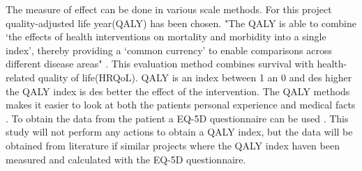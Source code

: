 The measure of effect can be done in various scale methods. For this project quality-adjusted life year(QALY) has been chosen. "The QALY is able to combine ‘the effects of health interventions on mortality and morbidity into a single index’, thereby providing a ‘common currency’ to enable comparisons across different disease areas" \cite{QALY}. This evaluation method combines survival with health-related quality of life(HRQoL). QALY is an index between  1 an 0 and des higher the QALY index is des better the effect of the intervention. The QALY methods makes it easier to look at both the patients personal experience and medical facts \cite{QALY}. To obtain the data from the patient a EQ-5D questionnaire can be used \cite{costeffect}. This study will not perform any actions to obtain a QALY index, but the data will be obtained from literature if similar projects where the QALY index haven been measured and calculated with the EQ-5D questionnaire.














